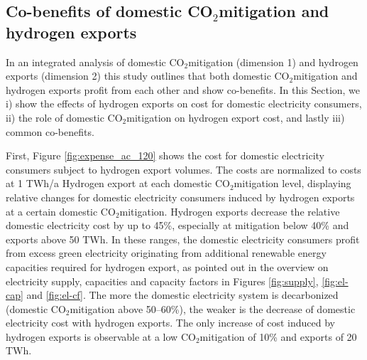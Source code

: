 \documentclass[5p,numafflabel]{elsarticle}
\newcommand{\co}{\ce{CO2}~}
\def\co{CO${}_2${\:}}
\begin{document}
\subsection*{Co-benefits of domestic \co mitigation and hydrogen exports}
\label{subsec:benefits}

In an integrated analysis of domestic \co mitigation (dimension 1) and hydrogen exports (dimension 2) this study outlines that both domestic \co mitigation and hydrogen exports profit from each other and show co-benefits. In this Section, we i) show the effects of hydrogen exports on cost for domestic electricity consumers, ii) the role of domestic \co mitigation on hydrogen export cost, and lastly iii) common co-benefits.

First, Figure \ref{fig:expense_ac_120} shows the cost for domestic electricity consumers subject to hydrogen export volumes. The costs are normalized to costs at 1 TWh/a Hydrogen export at each domestic \co mitigation level, displaying relative changes for domestic electricity consumers induced by hydrogen exports at a certain domestic \co mitigation.
Hydrogen exports decrease the relative domestic electricity cost by up to 45\%, especially at mitigation below 40\% and exports above 50 TWh. 
In these ranges, the domestic electricity consumers profit from excess green electricity originating from additional renewable energy capacities required for hydrogen export, as pointed out in the overview on electricity supply, capacities and capacity factors in Figures \ref{fig:supply}, \ref{fig:el-cap} and \ref{fig:el-cf}.
The more the domestic electricity system is decarbonized (domestic \co mitigation above 50--60\%), the weaker is the decrease of domestic electricity cost with hydrogen exports.
The only increase of cost induced by hydrogen exports is observable at a low \co mitigation of 10\% and exports of 20 TWh. 
\end{document}
